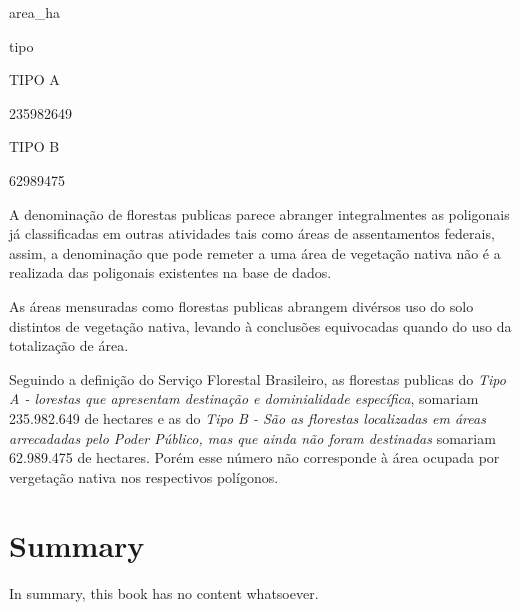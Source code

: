 \documentclass[
  letterpaper,
]{report}
\begin{document}
\n      

area\_ha

\n    

\n    

\n      

tipo

\n      

\n    

\n  

\n  

\n    

\n      

TIPO A

\n      

235982649

\n    

\n    

\n      

TIPO B

\n      

62989475

\n    

\n  

\n

A denominação de florestas publicas parece abranger integralmentes as
poligonais já classificadas em outras atividades tais como áreas de
assentamentos federais, assim, a denominação que pode remeter a uma área
de vegetação nativa não é a realizada das poligonais existentes na base
de dados.

As áreas mensuradas como florestas publicas abrangem divérsos uso do
solo distintos de vegetação nativa, levando à conclusões equivocadas
quando do uso da totalização de área.

Seguindo a definição do Serviço Florestal Brasileiro, as florestas
publicas do \emph{Tipo A - lorestas que apresentam destinação e
dominialidade específica}, somariam 235.982.649 de hectares e as do
\emph{Tipo B - São as florestas localizadas em áreas arrecadadas pelo
Poder Público, mas que ainda não foram destinadas} somariam 62.989.475
de hectares. Porém esse número não corresponde à área ocupada por
vergetação nativa nos respectivos polígonos.


\hypertarget{summary}{%
\chapter{Summary}\label{summary}}

In summary, this book has no content whatsoever.
\end{document}
